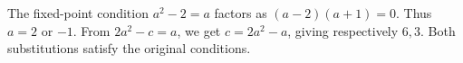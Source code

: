 The fixed-point condition $a^2-2=a$ factors as $(a-2)(a+1)=0$. Thus $a=2$ or $-1$. From $2a^2-c=a$, we get $c=2a^2-a$, giving respectively $\boxed{6,3}$. Both substitutions satisfy the original conditions.
